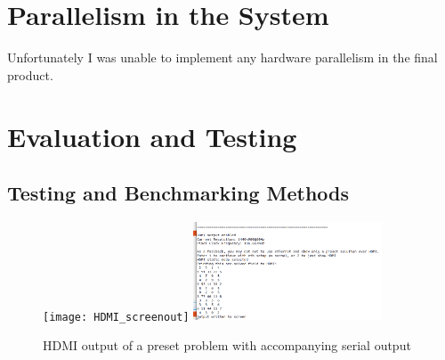 \documentclass[11pt]{article}
\begin{document}
\newpage
\section{Parallelism in the System}


Unfortunately I was unable to implement any hardware parallelism in the final product.

\newpage
\section{Evaluation and Testing}

\subsection{Testing and Benchmarking Methods}\label{sec:testing_benchmarking}


\begin{figure}[h]
  \centering
  \texttt{[image: HDMI\_screenout]}
  \includegraphics[width=0.5\textwidth]{HDMI_serialout}
  \caption{HDMI output of a preset problem with accompanying serial output}
\end{figure}
\end{document}
